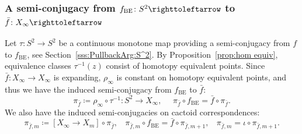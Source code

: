 \documentclass{amsart}
\theoremstyle{plain}
\theoremstyle{definition}
\theoremstyle{remark}
\renewcommand{\AA}{{\mathcal A}}
\newcommand{\blowup}{{\operatorname{blow}}}
\renewcommand{\sp}{{\ \ }}
\newcommand{\CC}{{\mathcal C}}
\newcommand\selfmap{\righttoleftarrow}
\begin{document}
\subsubsection{A semi-conjugacy from $f_{\text{BE}}\colon S^2\selfmap$ to $\bar f\colon X_\infty\selfmap$} \label{ss:fibers_in_quotient} Let $\tau\colon S^2\to S^2$ be a continuous monotone map providing a semi-conjugacy from $f$ to $f_{\text{BE}}$, see Section~\ref{sss:PullbackArg:S^2}. By Proposition~\ref{prop:hom equiv}, equivalence classes $\tau^{-1}(z)$ consist of homotopy equivalent points. Since $\bar f\colon X_\infty \to X_\infty$ is expanding, $\rho_\infty$ is constant on homotopy equivalent points, and thus we have the induced semi-conjugacy from $f_{\text{BE}}$ to $\bar f$:
\begin{equation}
\label{ed:dfn:pi:BE} \pi_{\bar f} \coloneq \rho_\infty\circ  \tau^{-1} \colon S^2\to X_\infty ,\sp\sp\sp \pi_{\bar f} \circ f_{\text{BE}}= \bar f \circ \pi_{\bar f}.
\end{equation}
We also have the induced semi-conjugacies on cactoid correspondences:
\[\pi_{\bar f, m}\coloneq  [X_\infty \to X_m]\circ \pi_{\bar f},\sp\sp  \pi_{\bar f,m} \circ f_{\text{BE}}= \bar f \circ \pi_{\bar f, m+1}, \sp\sp  \pi_{\bar f,m}= \iota \circ \pi_{\bar f,m+1}.\]


\end{document}
